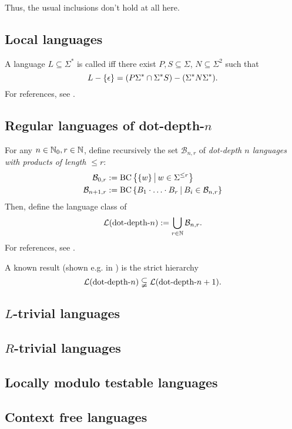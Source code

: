 Thus, the usual inclusions don't hold at all here.

\subsection{Local languages}
\label{lang:local}
A language $L \subseteq \Sigma^*$ is called  iff there exist $P,S \subseteq \Sigma$, $N \subseteq \Sigma^2$ such that
\[ L - \Set{\epsilon} = (P\Sigma^* \cap \Sigma^* S) - (\Sigma^* N \Sigma^*). \]
For references, see \cite{Berstel1996439}.

\subsection{Regular languages of dot-depth-$n$}
\label{lang:dotdepth}
For any $n \in \mathbb{N}_0, r \in \mathbb{N}$, define recursively the set $\mathcal{B}_{n,r}$ of \emph{dot-depth $n$ languages with products of length $\le r$}:
\begin{align*}
\mathcal{B}_{0,r} & := \BC \Set{\Set{w}}{w \in \Sigma^{\le r}} \\
\mathcal{B}_{n+1,r} & := \BC \Set{B_1 \cdot \dotsc \cdot B_r}{B_i \in \mathcal{B}_{n,r}}
\end{align*}
Then, define the language class of 
\[ \mathcal{L}(\textup{\textrm{dot-depth-$n$}}) := \bigcup_{r\in\mathbb{N}} \mathcal{B}_{n,r} . \]
For references, see \cite{ConcatGameDotDepth}.

A known result (shown e.g. in \cite{ConcatGameDotDepth}) is the strict hierarchy
\[ \mathcal{L}(\textup{\textrm{dot-depth-$n$}}) \subsetneqq \mathcal{L}(\textup{\textrm{dot-depth-$n+1$}}). \]

\subsection{$L$-trivial languages}
\label{lang:Ltrivial}
\subsection{$R$-trivial languages}
\label{lang:Rtrivial}
\subsection{Locally modulo testable languages}
\label{lang:LmodT}


\subsection{Context free languages}
\label{lang:contextfree}


